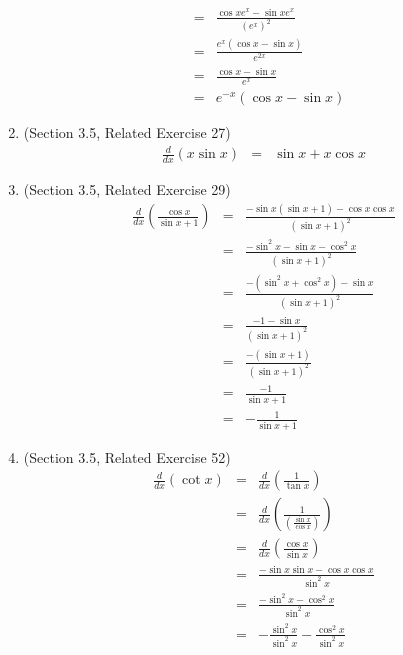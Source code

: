 \documentclass{article}
\begin{document}
\begin{enumerate}
\begin{eqnarray}
            &=& \frac{\cos{x}e^x - \sin{x}e^x}{\left(e^x\right)^2} \\
            &=& \frac{e^x\left(\cos{x} - \sin{x}\right)}{e^{2x}} \\
            &=& \frac{\cos{x} - \sin{x}}{e^x} \\
            &=& e^{-x} \left(\cos{x} - \sin{x}\right)
        \end{eqnarray}
    \item (Section 3.5, Related Exercise 27)
        \begin{eqnarray}
            \frac{d}{dx}\left(x \sin{x}\right) &=& \sin{x} + x\cos{x}
        \end{eqnarray}
    \item (Section 3.5, Related Exercise 29)
        \begin{eqnarray}
            \frac{d}{dx}\left(\frac{\cos{x}}{\sin{x} + 1}\right) &=& \frac{-\sin{x}(\sin{x} + 1) - \cos{x}\cos{x}}{\left(\sin{x} + 1\right)^2} \\
            &=& \frac{-\sin^2{x} - \sin{x} - \cos^2{x}}{\left(\sin{x} + 1\right)^2} \\
            &=& \frac{-(\sin^2{x} + \cos^2{x}) - \sin{x}}{\left(\sin{x} + 1\right)^2} \\
            &=& \frac{- 1 - \sin{x}}{\left(\sin{x} + 1\right)^2} \\
            &=& \frac{- \left(\sin{x} + 1\right)}{\left(\sin{x} + 1\right)^2} \\
            &=& \frac{-1}{\sin{x} + 1} \\
            &=& -\frac{1}{\sin{x} + 1}
        \end{eqnarray}
    \item (Section 3.5, Related Exercise 52)
        \begin{eqnarray}
            \frac{d}{dx}\left(\cot{x}\right) &=& \frac{d}{dx}\left(\frac{1}{\tan{x}}\right) \\
                                             &=& \frac{d}{dx}\left(\frac{1}{\left(\frac{\sin{x}}{\cos{x}}\right)}\right) \\
                                             &=& \frac{d}{dx}\left(\frac{\cos{x}}{\sin{x}}\right) \\
                                             &=& \frac{-\sin{x}\sin{x} - \cos{x}\cos{x}}{\sin^2{x}} \\
                                             &=& \frac{-\sin^2{x} - \cos^2{x}}{\sin^2{x}} \\
                                             &=& - \frac{\sin^2{x}}{\sin^2{x}} - \frac{\cos^2{x}}{\sin^2{x}} \\

\end{eqnarray}
\end{enumerate}
\end{document}
